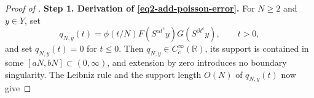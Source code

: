 \documentclass[reqno,12pt]{amsart}
\def \R {\mathbb R}
\numberwithin{equation}{section}
\begin{document}
\begin{proof}[Proof of ]
\medskip
\noindent\textbf{Step 1. Derivation of \eqref{eq2-add-poisson-error}.}
For $N\ge2$ and $y\in Y$, set
\[
 q_{N,y}(t)=\phi(t/N)F(S^{\alpha t^c}y)G(S^{\beta t^c}y),
 \qquad t>0,
\]
and set $q_{N,y}(t)=0$ for $t\le0$. Then
$q_{N,y}\in C_c^\infty(\R)$, its support is contained in some $[aN,bN]\subset (0,\infty)$,
and extension by zero introduces no boundary singularity.
%
%
The Leibniz rule and the support length $O(N)$ of $q_{N,y}(t)$ now give

\end{proof}
\end{document}
